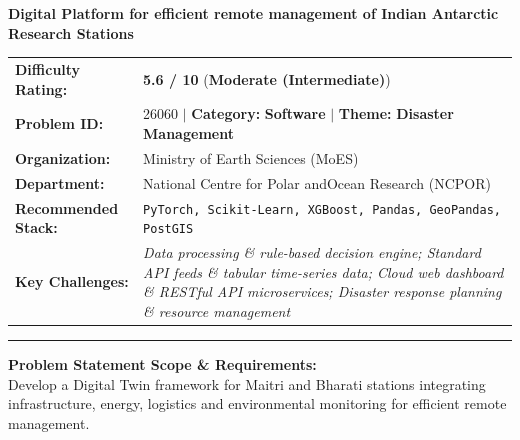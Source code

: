 \documentclass[10pt,a4paper]{article}
\begin{document}
\begin{tcolorbox}[pscard, title={"\textbf{SIH26060} \quad $\vert$ \quad Digital Platform for efficient remote management of Indian Antarctic Resear...}]
\textbf{\large Digital Platform for efficient remote management of Indian Antarctic Research Stations}\\[0.25cm]

\begin{tabular}{@{}lp{12.5cm}@{}}
\textbf{Difficulty Rating:} & \textcolor{diffmod}{\textbf{\Large 5.6 / 10}} \quad (\textbf{Moderate (Intermediate)}) \\
\textbf{Problem ID:} & 26060 \quad $\vert$ \quad \textbf{Category:} \textbf{Software} \quad $\vert$ \quad \textbf{Theme:} \textbf{Disaster Management} \\
\textbf{Organization:} & Ministry of Earth Sciences (MoES) \\
\textbf{Department:} & National Centre for Polar andOcean Research (NCPOR) \\
\textbf{Recommended Stack:} & \texttt{PyTorch, Scikit-Learn, XGBoost, Pandas, GeoPandas, PostGIS} \\
\textbf{Key Challenges:} & \textit{\small Data processing \& rule-based decision engine; Standard API feeds \& tabular time-series data; Cloud web dashboard \& RESTful API microservices; Disaster response planning \& resource management} \\
\end{tabular}

\vspace{0.2cm}
\hrule
\vspace{0.2cm}

\textbf{\color{sihnavy}Problem Statement Scope \& Requirements:}\\[0.15cm]
\noindent\small Develop a Digital Twin framework for Maitri and Bharati stations integrating infrastructure, energy, logistics and environmental monitoring for efficient remote management.\par\vspace{0.06cm}

\end{tcolorbox}
\vspace{0.4cm}
{}
\end{document}
